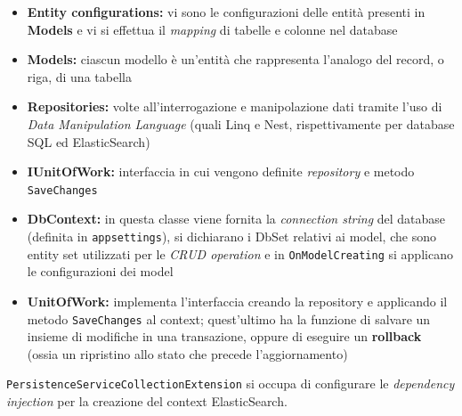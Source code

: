 \begin{itemize}
\item 
\textbf{Entity configurations:} vi sono le configurazioni delle entità presenti in \textbf{Models} e vi si effettua il \textit{mapping} di tabelle e colonne nel database
\item
\textbf{Models:} ciascun modello è un'entità che rappresenta l'analogo del record, o riga, di una tabella
\item 
\textbf{Repositories:} volte all'interrogazione e manipolazione dati tramite l'uso di \textit{Data Manipulation Language} (quali Linq e Nest, rispettivamente per database SQL ed ElasticSearch)
\item 
\textbf{IUnitOfWork:} interfaccia in cui vengono definite \textit{repository} e metodo \verb|SaveChanges|
\item
\textbf{DbContext:} in questa classe viene fornita la \textit{connection string} del database (definita in \verb|appsettings|), si dichiarano i DbSet relativi ai model, che sono entity set utilizzati per le \textit{CRUD operation} \cite{DbSet} e in \verb|OnModelCreating| si applicano le configurazioni dei model
\item 
\textbf{UnitOfWork:} implementa l'interfaccia creando la repository e applicando il metodo \verb|SaveChanges| al context; quest'ultimo ha la funzione di salvare un insieme di modifiche in una transazione, oppure di eseguire un \textbf{rollback} (ossia un ripristino allo stato che precede l'aggiornamento)
\end{itemize}
\verb|PersistenceServiceCollectionExtension| si occupa di configurare le \textit{dependency injection} per la creazione del context ElasticSearch.